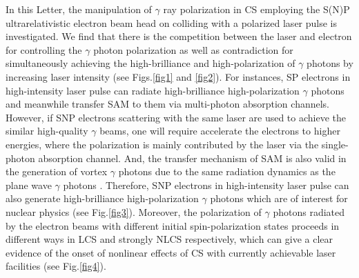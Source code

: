 \documentclass[10pt,twocolumn,showpacs,amsmath,amssymb,floatfix,superscriptaddress]{revtex4-2}
\begin{document}
In this Letter, the manipulation of $\gamma$ ray polarization in CS employing the S(N)P ultrarelativistic electron beam head on colliding with a polarized laser pulse is investigated. We find that there is the competition between the laser and electron for controlling the $\gamma$ photon polarization as well as contradiction for simultaneously achieving the high-brilliance and high-polarization of $\gamma$ photons by increasing laser intensity (see Figs.\ref{fig1} and \ref{fig2}). For instances, SP electrons in high-intensity laser pulse can radiate high-brilliance high-polarization $\gamma$ photons and meanwhile transfer SAM to them via multi-photon absorption channels. However, if SNP electrons scattering with the same laser are used to achieve the similar high-quality $\gamma$ beams, one will require accelerate the electrons to higher energies, where the polarization is mainly contributed by the laser via the single-photon absorption channel. And, the transfer mechanism of SAM is also valid in the generation of vortex $\gamma$ photons due to the same radiation dynamics as the plane wave $\gamma$ photons \cite{Ababekri2022}. Therefore, SNP electrons in high-intensity laser pulse can also generate high-brilliance high-polarization $\gamma$ photons which are of interest for nuclear physics (see Fig.\ref{fig3}). Moreover, the polarization of $\gamma$ photons radiated by the electron beams with different initial spin-polarization states proceeds in different ways in LCS and strongly NLCS respectively, which can give a clear evidence of the onset of nonlinear effects of CS with currently achievable laser facilities (see Fig.\ref{fig4}).
\end{document}
